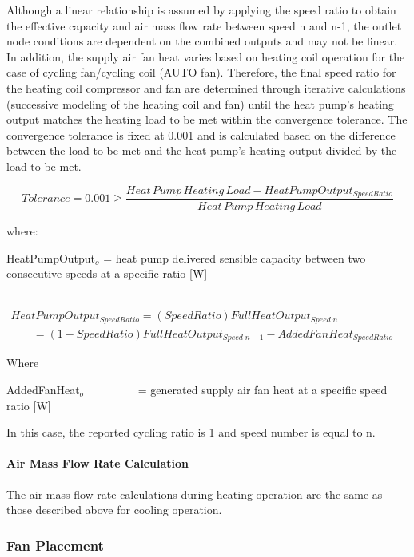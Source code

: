 Although a linear relationship is assumed by applying the speed ratio to obtain the effective capacity and air mass flow rate between speed n and n-1, the outlet node conditions are dependent on the combined outputs and may not be linear. In addition, the supply air fan heat varies based on heating coil operation for the case of cycling fan/cycling coil (AUTO fan). Therefore, the final speed ratio for the heating coil compressor and fan are determined through iterative calculations (successive modeling of the heating coil and fan) until the heat pump's heating output matches the heating load to be met within the convergence tolerance. The convergence tolerance is fixed at 0.001 and is calculated based on the difference between the load to be met and the heat pump's heating output divided by the load to be met.

\begin{equation}
Tolerance = 0.001 \ge \frac{{Heat\,Pump\,Heating\,Load - HeatPumpOutpu{t_{SpeedRatio}}}}{{Heat\,Pump\,Heating\,Load}}
\end{equation}

where:

HeatPumpOutput\(_{o}\) = heat pump delivered sensible capacity between two consecutive speeds at a specific ratio {[}W{]}

~~~~~~ \(\begin{array}{l}HeatPumpOutpu{t_{SpeedRatio}} = (SpeedRatio)FullHeatOutpu{t_{Speed\;n}}\\\;\;\;\;\;\;\; = (1 - SpeedRatio)FullHeatOutpu{t_{Speed\;n - 1}} - AddedFanHea{t_{SpeedRatio}}\end{array}\)

Where

AddedFanHeat\(_{o}\)~~~~~~~~~ = generated supply air fan heat at a specific speed ratio {[}W{]}

In this case, the reported cycling ratio is 1 and speed number is equal to n.

\paragraph{Air Mass Flow Rate Calculation}\label{air-mass-flow-rate-calculation-3}

The air mass flow rate calculations during heating operation are the same as those described above for cooling operation.

\subsubsection{Fan Placement}\label{fan-placement}

